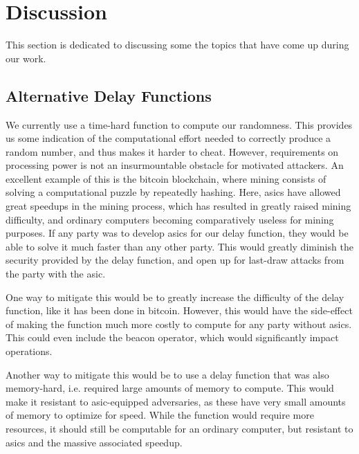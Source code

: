 \section{Discussion}%
\label{sec:discussion}
This section is dedicated to discussing some the topics that have come up during our work.


\subsection{Alternative Delay Functions}
We currently use a time-hard function to compute our randomness. This provides us some indication of the computational effort needed to correctly produce a random number, and thus makes it harder to cheat.
However, requirements on processing power is not an insurmountable obstacle for motivated attackers. An excellent example of this is the bitcoin blockchain, where mining consists of solving a computational puzzle by repeatedly hashing. Here, \acrfull{asic}s have allowed great speedups in the mining process, which has resulted in greatly raised mining difficulty, and ordinary computers becoming comparatively useless for mining purposes.
If any party was to develop \acrshort{asic}s for our delay function, they would be able to solve it much faster than any other party. This would greatly diminish the security provided by the delay function, and open up for last-draw attacks from the party with the \acrshort{asic}.

One way to mitigate this would be to greatly increase the difficulty of the delay function, like it has been done in bitcoin. However, this would have the side-effect of making the function much more costly to compute for any party without \acrshort{asic}s. This could even include the beacon operator, which would significantly impact operations.

Another way to mitigate this would be to use a delay function that was also memory-hard, i.e. required large amounts of memory to compute. This would make it resistant to \acrshort{asic}-equipped adversaries, as these have very small amounts of memory to optimize for speed. While the function would require more resources, it should still be computable for an ordinary computer, but resistant to \acrshort{asic}s and the massive associated speedup.

